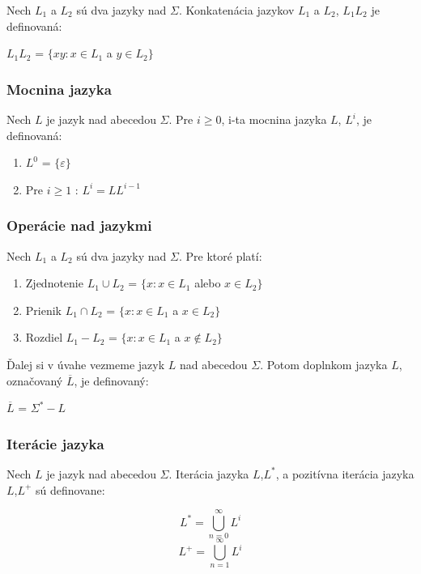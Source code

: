 Nech $L_1$ a $L_2$ sú dva jazyky nad $\Sigma$. Konkatenácia jazykov $L_1$ a $L_2$, $L_1L_2$ je definovaná:
\begin{center}
$L_1L_2$ = $\{ xy: x \in L_1$ a $y \in L_2 \}$
\end{center}

\subsubsection{Mocnina jazyka}

Nech $L$ je jazyk nad abecedou $\Sigma$. Pre $i\geq0$, i-ta mocnina jazyka $L$, $L^i$, je definovaná:
\begin{enumerate}
\item $L^0$ = $\{\varepsilon\}$
\item Pre $i\geq1$ : $L^i = LL^{i-1}$
\end{enumerate}

\subsubsection{Operácie nad jazykmi}

Nech $L_1$ a $L_2$ sú dva jazyky nad $\Sigma$. Pre ktoré platí: 
\begin{enumerate}
\item Zjednotenie $L_1 \cup L_2$ = $\{ x: x \in L_1$ alebo $x \in L_2 \}$
\item Prienik $L_1 \cap L_2$ = $\{ x: x \in L_1$ a $x \in L_2 \}$
\item Rozdiel $L_1 - L_2$ = $\{ x: x \in L_1$ a $x \not\in L_2 \}$
\end{enumerate}

Ďalej si v úvahe vezmeme jazyk $L$ nad abecedou $\Sigma$. Potom doplnkom jazyka $L$, označovaný $\overline{L}$, je definovaný: 
\begin{center}
$\overline{L}$ = $\Sigma^\ast - L$
\end{center}

\subsubsection{Iterácie jazyka}

Nech $L$ je jazyk nad abecedou $\Sigma$. Iterácia jazyka $L$,$L^\ast$, a pozitívna iterácia jazyka $L$,$L^+$ sú definovane:
\begin{center}
\[ L^\ast = \bigcup_{n=0}^{\infty} L^{i} \]
\[ L^+ = \bigcup_{n=1}^{\infty} L^{i} \]
\end{center}

